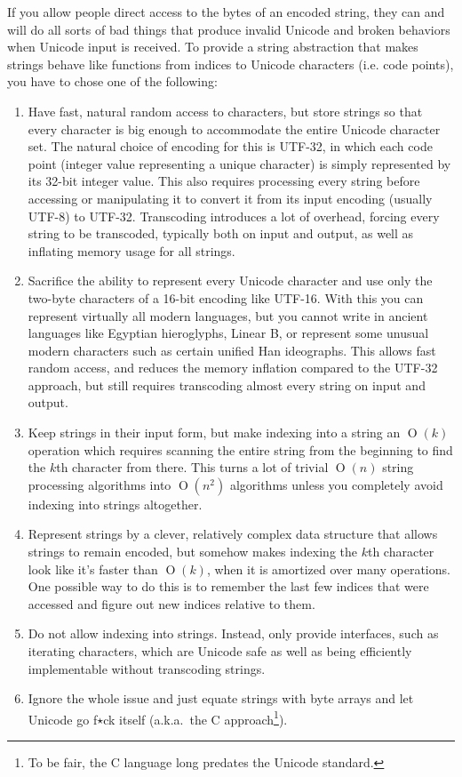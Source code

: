 \documentclass{article}
\renewcommand{\O}{\ensuremath{\operatorname{O}}}
\begin{document}
If you allow people direct access to the bytes of an encoded string, they can and will do all sorts of bad things that produce invalid Unicode and broken behaviors when Unicode input is received.
To provide a string abstraction that makes strings behave like functions from indices to Unicode characters (i.e. code points), you have to chose one of the following:
\begin{enumerate}

\item Have fast, natural random access to characters, but store strings so that every character is big enough to accommodate the entire Unicode character set.
The natural choice of encoding for this is UTF-32, in which each code point (integer value representing a unique character) is simply represented by its 32-bit integer value.
This also requires processing every string before accessing or manipulating it to convert it from its input encoding (usually UTF-8) to UTF-32.
Transcoding introduces a lot of overhead, forcing every string to be transcoded, typically both on input and output, as well as inflating memory usage for all strings.

\item Sacrifice the ability to represent every Unicode character and use only the two-byte characters of a 16-bit encoding like UTF-16.
With this you can represent virtually all modern languages, but you cannot write in ancient languages like Egyptian hieroglyphs, Linear B, or represent some unusual modern characters such as certain unified Han ideographs.
This allows fast random access, and reduces the memory inflation compared to the UTF-32 approach, but still requires transcoding almost every string on input and output.

\item Keep strings in their input form, but make indexing into a string an $\O(k)$ operation which requires scanning the entire string from the beginning to find the $k$th character from there.
This turns a lot of trivial $\O(n)$ string processing algorithms into $\O(n^2)$ algorithms unless you completely avoid indexing into strings altogether.

\item Represent strings by a clever, relatively complex data structure that allows strings to remain encoded, but somehow makes indexing the $k$th character look like it's faster than $\O(k)$, when it is amortized over many operations.
One possible way to do this is to remember the last few indices that were accessed and figure out new indices relative to them.

\item Do not allow indexing into strings. Instead, only provide interfaces, such as iterating characters, which are Unicode safe as well as being efficiently implementable without transcoding strings.

\item Ignore the whole issue and just equate strings with byte arrays and let Unicode go f$\star$ck itself (a.k.a.~the C approach\footnote{To be fair, the C language long predates the Unicode standard.}).

\end{enumerate}
\end{document}
